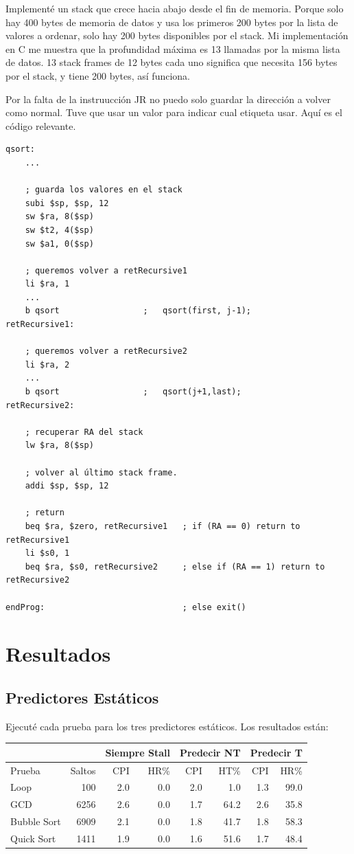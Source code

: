 \documentclass[a4paper]{article}
\begin{document}
Implementé un stack que crece hacia abajo desde el fin de memoria. Porque solo hay 400 bytes de memoria de datos y usa los primeros 200 bytes por la lista de valores a ordenar, solo hay 200 bytes disponibles por el stack. Mi implementación en C me muestra que la profundidad máxima es 13 llamadas por la misma lista de datos. 13 stack frames de 12 bytes cada uno significa que necesita 156 bytes por el stack, y tiene 200 bytes, así funciona.

Por la falta de la instruucción JR no puedo solo guardar la dirección a volver como normal. Tuve que usar un valor para indicar cual etiqueta usar. Aquí es el código relevante.

\begin{verbatim}
qsort:
    ...

    ; guarda los valores en el stack
    subi $sp, $sp, 12
    sw $ra, 8($sp)
    sw $t2, 4($sp)
    sw $a1, 0($sp)

    ; queremos volver a retRecursive1
    li $ra, 1
    ...
    b qsort                 ;   qsort(first, j-1);
retRecursive1:

    ; queremos volver a retRecursive2
    li $ra, 2
    ...
    b qsort                 ;   qsort(j+1,last);
retRecursive2:

    ; recuperar RA del stack
    lw $ra, 8($sp)

    ; volver al último stack frame.
    addi $sp, $sp, 12

    ; return
    beq $ra, $zero, retRecursive1   ; if (RA == 0) return to retRecursive1
    li $s0, 1
    beq $ra, $s0, retRecursive2     ; else if (RA == 1) return to retRecursive2

endProg:                            ; else exit()
\end{verbatim}

\section{Resultados}

\subsection{Predictores Estáticos}

Ejecuté cada prueba para los tres predictores estáticos. Los resultados están:

\begin{tabular}{| l | r |  r r | r r | r r | }
\cline{3-8}
\multicolumn{2}{c|}{} & \multicolumn{2}{c|}{Siempre Stall} & \multicolumn{2}{c|}{Predecir NT} & \multicolumn{2}{c|}{Predecir T} \\ \hline
Prueba &  Saltos & CPI & HR\% & CPI & HT\% & CPI & HR\% \\ \hline
Loop        & 100  & 2.0 & 0.0 & 2.0 & 1.0  & 1.3 & 99.0 \\
GCD         & 6256 & 2.6 & 0.0 & 1.7 & 64.2 & 2.6 & 35.8 \\
Bubble Sort & 6909 & 2.1 & 0.0 & 1.8 & 41.7 & 1.8 & 58.3 \\
Quick Sort  & 1411 & 1.9 & 0.0 & 1.6 & 51.6 & 1.7 & 48.4 \\
\hline
\end{tabular}
\end{document}
